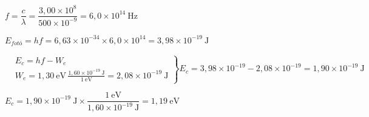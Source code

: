 \begin{solapartat}
 $f = \dfrac{c}{\lambda} = \dfrac{3,00\times 10^{8}}{500\times 10^{-9}} = 6,0\times 10^{14}\ \mathrm{Hz}$

\smallskip
{} $E_{\textit{fotó}} = hf = 6,63\times 10^{-34}\times 6,0\times 10^{14} = 3,98\times 10^{-19}\ \mathrm{J}$ \quad{}
\end{solapartat}

\begin{solapartat}
\begin{minipage}[t]{0.06\linewidth}
\vspace{0pt}

\vspace{14pt}
\end{minipage}\hfill
\begin{minipage}[t]{0.93\linewidth}
\vspace{0pt}
$\left.\begin{aligned}
&E_c = hf - W_e\\[4pt]
&W_e = 1,30\ \mathrm{eV}\,\frac{1,60\times 10^{-19}\ \mathrm{J}}{1\ \mathrm{eV}} = 2,08\times 10^{-19}\ \mathrm{J}
\end{aligned}\right\}
E_c = 3,98\times 10^{-19} - 2,08\times 10^{-19} = 1,90\times 10^{-19}\ \mathrm{J}$

\hfill{}\hspace*{3em}
\end{minipage}

\medskip
{} $E_c = 1,90\times 10^{-19}\ \mathrm{J}\times \dfrac{1\ \mathrm{eV}}{1,60\times 10^{-19}\ \mathrm{J}} = 1,19\ \mathrm{eV}$
\end{solapartat}
